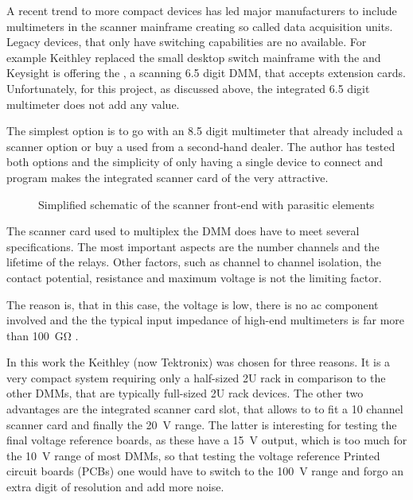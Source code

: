 A recent trend to more compact devices has led major manufacturers to include multimeters in the scanner mainframe creating so called data acquisition units. Legacy devices, that only have switching capabilities are no available. For example Keithley replaced the small desktop switch mainframe  with the  and Keysight is offering the , a scanning \num{6.5} digit DMM, that accepts extension cards. Unfortunately, for this project, as discussed above, the integrated \num{6.5} digit multimeter does not add any value.

The simplest option is to go with an \num{8.5} digit multimeter that already included a scanner option or buy a used  from a second-hand dealer. The author has tested both options and the simplicity of only having a single device to connect and program makes the integrated scanner card of the  very attractive.

\begin{figure}[ht]
    \centering
    \caption{Simplified schematic of the scanner front-end with parasitic elements}
\end{figure}

The scanner card used to multiplex the DMM does have to meet several specifications. The most important aspects are the number channels and the lifetime of the relays. Other factors, such as channel to channel isolation, the contact potential, resistance and maximum voltage is not the limiting factor.

The reason is, that in this case, the voltage is low, there is no ac component involved and the the typical input impedance of high-end multimeters is far more than \qty{100}{\giga\ohm} \cite{datasheet_fluke8588A,article_3458A_input_mpedance_2,datasheet_keithley2002,article_3458A_input_mpedance}.

In this work the Keithley (now Tektronix)  was chosen for three reasons. It is a very compact system requiring only a half-sized 2U rack in comparison to the other DMMs, that are typically full-sized 2U rack devices. The other two advantages are the integrated scanner card slot, that allows to to fit a 10 channel scanner card and finally the \qty{20}{\volt} range. The latter is interesting for testing the final voltage reference boards, as these have a \qty{15}{\volt} output, which is too much for the \qty{10}{\volt} range of most DMMs, so that testing the voltage reference Printed circuit boards
(PCBs) one would have to switch to the \qty{100}{\volt} range and forgo an extra digit of resolution and add more noise.


